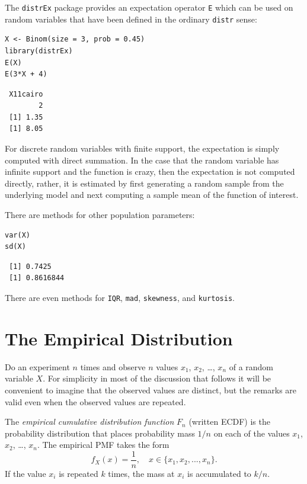 \documentclass[captions=tableheading]{scrbook}
\begin{document}
The \texttt{distrEx} package provides an expectation operator \texttt{E} which can be used on random variables that have been defined in the ordinary \texttt{distr} sense:


\begin{verbatim}
X <- Binom(size = 3, prob = 0.45)
library(distrEx)
E(X)
E(3*X + 4)
\end{verbatim}

\begin{verbatim}
 X11cairo 
        2
 [1] 1.35
 [1] 8.05
\end{verbatim}

For discrete random variables with finite support, the expectation is simply computed with direct summation. In the case that the random variable has infinite support and the function is crazy, then the expectation is not computed directly, rather, it is estimated by first generating a random sample from the underlying model and next computing a sample mean of the function of interest. 

There are methods for other population parameters:


\begin{verbatim}
var(X)
sd(X)
\end{verbatim}

\begin{verbatim}
 [1] 0.7425
 [1] 0.8616844
\end{verbatim}

There are even methods for \texttt{IQR}, \texttt{mad}, \texttt{skewness}, and \texttt{kurtosis}.
\section{The Empirical Distribution}
\label{sec-5-5}

\label{sec:empirical-distribution}

Do an experiment \(n\) times and observe \(n\) values \(x_{1}\), \(x_{2}\), \ldots{}, \(x_{n}\) of a random variable \(X\). For simplicity in most of the discussion that follows it will be convenient to imagine that the observed values are distinct, but the remarks are valid even when the observed values are repeated. 

\begin{defn}
The \emph{empirical cumulative distribution function} \(F_{n}\) (written ECDF) is the probability distribution that places probability mass \(1/n\) on each of the values \(x_{1}\), \(x_{2}\), \ldots{}, \(x_{n}\). The empirical PMF takes the form
\begin{equation} 
f_{X}(x)=\frac{1}{n},\quad x\in \{ x_{1},x_{2},...,x_{n} \}.
\end{equation}
If the value \(x_{i}\) is repeated \(k\) times, the mass at \(x_{i}\) is accumulated to \(k/n\).
\end{defn}
\end{document}

